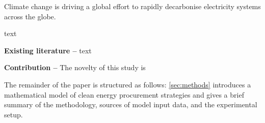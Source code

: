 %



Climate change is driving a global effort to rapidly decarbonise electricity systems across the globe.

text


\textbf{Existing literature --}
text


\textbf{Contribution --} The novelty of this study is


The remainder of the paper is structured as follows: \cref{sec:methods} introduces a mathematical model of clean energy procurement strategies and gives a brief summary of the methodology, sources of model input data, and the experimental setup.

